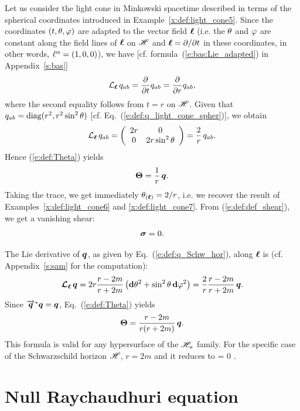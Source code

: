 {{\begin{example} \label{x:def:light_cone8}
Let us consider the light cone in Minkowski spacetime described in terms of the
spherical coordinates introduced in Example~\ref{x:def:light_cone5}.
Since the coordinates $(t,\theta,\varphi)$
are adapted to the vector field $\bm{\ell}$ (i.e. the $\theta$ and $\varphi$ are constant
along the field lines of $\bm{\ell}$ on $\mathscr{H}$ and $\bm{\ell} = \partial/\partial t$ in these
coordinates, in other words, $\ell^\alpha=(1,0,0)$), we have [cf. formula~(\ref{e:bas:Lie_adapted})
in Appendix~\ref{s:bas}]
\[
    {\mathcal{L}}_{\bm{\ell}}\, q_{ab} = \frac{\partial }{\partial t} q_{ab} = \frac{\partial }{\partial r} q_{ab} ,
\]
where the second equality follows from $t=r$ on $\mathscr{H}$. Given that
$q_{ab} = \mathrm{diag}(r^2, r^2\sin^2\theta)$
[cf. Eq.~(\ref{e:def:q_light_cone_spher})], we obtain
\[
    {\mathcal{L}}_{\bm{\ell}}\, q_{ab} = \left( \begin{array}{cc}
        2 r & 0  \\
        0 & 2 r \sin^2\theta
        \end{array} \right)
        = \frac{2}{r} \, q_{ab} .
\]
Hence (\ref{e:def:Theta}) yields
\[
    \bm{\Theta} = \frac{1}{r} \, \bm{q} .
\]
Taking the trace, we get immediately $\theta_{(\bm{\ell})} = 2/r$, i.e. we recover
the result of Examples~\ref{x:def:light_cone6} and \ref{x:def:light_cone7}.
From (\ref{e:def:def_shear}), we get a vanishing shear:
\[
    \bm{\sigma} = 0 .
\]
\end{example}

\begin{example} \label{x:def:Schw_hor8}
The Lie derivative of $\bm{q}$, as given by Eq.~(\ref{e:def:q_Schw_hor}),
along $\bm{\ell}$ is (cf. Appendix~\ref{s:sam} for the computation):
\[
    \bm{\mathcal{L}}_{\bm{\bm{\ell}}}\, \bm{q} =  2 r \frac{r-2m}{r+2m} \left( \mathbf{d}\theta^2
        +  \sin^2\theta \, \mathbf{d}\varphi^2 \right) = \frac{2}{r} \frac{r-2m}{r+2m}
            \, \bm{q} .
\]
Since $\overrightarrow{\bm{q}}^* \bm{q} = \bm{q}$, Eq.~(\ref{e:def:Theta}) yields
\[
    \bm{\Theta} = \frac{r-2m}{r(r+2m)} \, \bm{q} .
\]
This formula is valid for any hypersurface of the $\mathscr{H}_u$ family. For the specific
case of the Schwarzschild horizon $\mathscr{H}$, $r=2m$ and it reduces to
\be \label{e:def:Theta_zero_Schw_hor}
    \w{\Theta} = 0 .
\ee
\end{example}

\section{Null Raychaudhuri equation} \label{s:def:null_raychaud}

}}
